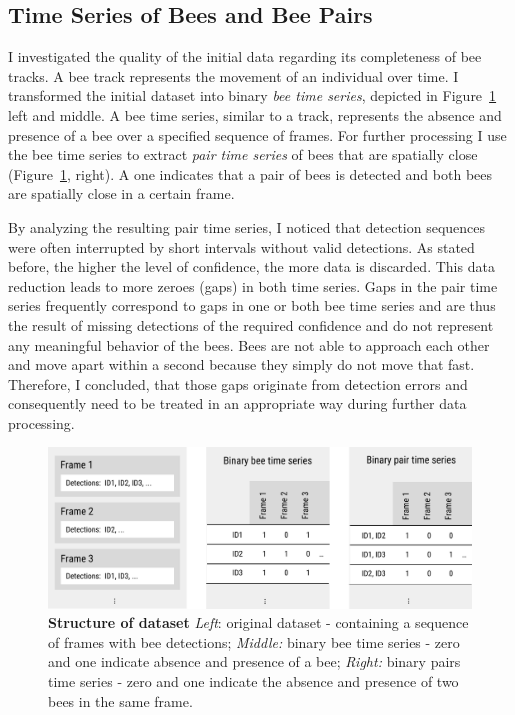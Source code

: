 \subsection{Time Series of Bees and Bee Pairs}
\label{subsec:tracking}
I investigated the quality of the initial data regarding its completeness of bee tracks.
A bee track represents the movement of an individual over time.
I transformed the initial dataset into binary \emph{bee time series}, depicted in Figure~\ref{fig:structure} left and middle.
A bee time series, similar to a track, represents the absence and presence of a bee over a specified sequence of frames.
For further processing I use the bee time series to extract \emph{pair time series} of bees that are spatially close (Figure~\ref{fig:structure}, right).
A one indicates that a pair of bees is detected and both bees are spatially close in a certain frame.

By analyzing the resulting pair time series, I noticed that detection sequences were often interrupted by short intervals without valid detections.
As stated before, the higher the level of confidence, the more data is discarded.
This data reduction leads to more zeroes (gaps) in both time series.
Gaps in the pair time series frequently correspond to gaps in one or both bee time series and are thus the result of missing detections of the required confidence and do not represent any meaningful behavior of the bees.
Bees are not able to approach each other and move apart within a second because they simply do not move that fast.
Therefore, I concluded, that those gaps originate from detection errors and consequently need to be treated in an appropriate way during further data processing.

\begin{figure}[tp]
	\centering
	\includegraphics[width=1.0\textwidth]{Figures/structure}
	\caption[Structure of dataset]{\textbf{Structure of dataset} \emph{Left}: original dataset - containing a sequence of frames with bee detections; \emph{Middle:} binary bee time series - zero and one indicate absence and presence of a bee; \emph{Right:} binary pairs time series - zero and one indicate the absence and presence of two bees in the same frame.}
	\label{fig:structure}
\end{figure}